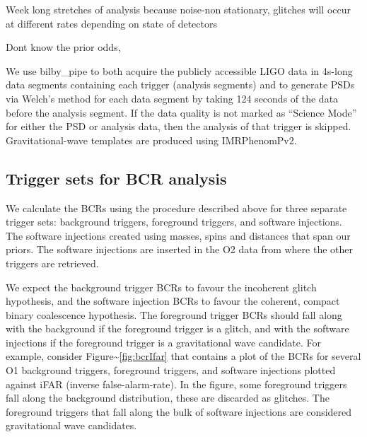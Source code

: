 \documentclass[%
 reprint,
 amsmath,amssymb,
 aps,
]{revtex4}
\newcommand{\bilbypipe}{{\sc bilby\_pipe}\xspace}
\newcommand{\imrphenomp}{{\sc IMRPhenomPv2}\xspace}
\begin{document}
Week long stretches of analysis because noise-non stationary, glitches will occur at different rates depending on state of detectors 


Dont know the prior odds, 


We use \bilbypipe to both acquire the publicly accessible LIGO data in 4s-long data segments containing each trigger (analysis segments) and to generate PSDs via Welch's method for each data segment by taking 124 seconds of the data before the analysis segment. If the data quality is not marked as ``Science Mode'' for either the PSD or analysis data, then the analysis of that trigger is skipped. Gravitational-wave templates
are produced using \imrphenomp. 


\hypertarget{trigger-sets-for-bcr-analysis}{%
\subsection{Trigger sets for BCR analysis}\label{trigger-sets-for-bcr-analysis}}

We calculate the BCRs using the procedure described above for three separate trigger sets: background triggers,
foreground triggers, and software injections. The software injections created using masses, spins and distances that
span our priors. The software injections are inserted in the O2 data from where the other triggers are retrieved.

We expect the background trigger BCRs to favour the incoherent glitch hypothesis, and the software injection BCRs to
favour the coherent, compact binary coalescence hypothesis. The foreground trigger BCRs should fall along with the
background if the foreground trigger is a glitch, and with the software injections if the foreground trigger is a
gravitational wave candidate. For example, consider Figure\textasciitilde\ref{fig:bcrIfar} that contains a plot of the BCRs for
several O1 background triggers, foreground triggers, and software injections plotted against iFAR (inverse
false-alarm-rate). In the figure, some foreground triggers fall along the background distribution, these are discarded
as glitches. The foreground triggers that fall along the bulk of software injections are considered gravitational wave
candidates.
\end{document}
